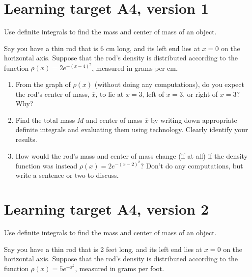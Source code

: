 




\everymath{\displaystyle}

\section{Learning target A4, version 1}

Use definite integrals to find the mass and center of mass of an object.

\hrulefill

Say you have a thin rod that is 6 cm long, and its left end lies at $x = 0$ on the horizontal axis.  Suppose that the rod's density is distributed according to the function $\rho(x) = 2e^{-(x-4)^2}$, measured in grams per cm.

\begin{enumerate}
	\item From the graph of $\rho(x)$ (without doing any computations), do you expect the rod's center of mass, $\overline{x}$, to lie at $x = 3$, left of $x = 3$, or right of $x = 3$?  Why?
	
	\vfill
	
	\item Find the total mass $M$ and center of mass $\overline{x}$ by writing down appropriate definite integrals and evaluating them using technology.  Clearly identify your results.

	\vfill
	\vfill

	\item How would the rod's mass and center of mass change (if at all) if the density function was instead $\rho(x) = 2e^{-(x-2)^2}$? Don't do any computations, but write a sentence or two to discuss.

	\vfill
	
\end{enumerate}

\pagebreak

\section{Learning target A4, version 2}

Use definite integrals to find the mass and center of mass of an object.

\hrulefill

Say you have a thin rod that is 2 feet long, and its left end lies at $x = 0$ on the horizontal axis.  Suppose that the rod's density is distributed according to the function $\rho(x) = 5e^{-x^2}$, measured in grams per foot.


